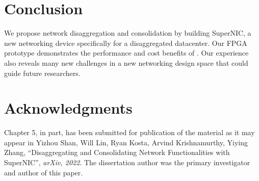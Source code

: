 \section{Conclusion}
\label{sec:snic:conclude}

We propose network disaggregation and consolidation by building SuperNIC, a new networking device specifically for a disaggregated datacenter.
Our FPGA prototype demonstrates the performance and cost benefits of \snic.
Our experience also reveals many new challenges in a new networking design space that could guide future researchers.

\section{Acknowledgments}
Chapter 5, in part, has been submitted for publication of the material as it may appear in Yizhou Shan, Will Lin, Ryan Kosta, Arvind Krishnamurthy, Yiying Zhang, ``Disaggregating and Consolidating Network Functionalities with SuperNIC'', \textit{arXiv, 2022}. The dissertation author was the primary investigator and author of this paper.